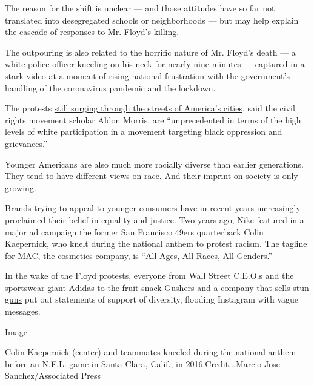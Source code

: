 The reason for the shift is unclear --- and those attitudes have so far
not translated into desegregated schools or neighborhoods --- but may
help explain the cascade of responses to Mr. Floyd's killing.

The outpouring is also related to the horrific nature of Mr. Floyd's
death --- a white police officer kneeling on his neck for nearly nine
minutes --- captured in a stark video at a moment of rising national
frustration with the government's handling of the coronavirus pandemic
and the lockdown.

The protests
\href{https://www.nytimes.com/interactive/2020/06/13/us/george-floyd-protests-cities-photos.html?action=click\&module=Top\%20Stories\&pgtype=Homepage}{still
surging through the streets of America's cities}, said the civil rights
movement scholar Aldon Morris, are ``unprecedented in terms of the high
levels of white participation in a movement targeting black oppression
and grievances.''

Younger Americans are also much more racially diverse than earlier
generations. They tend to have different views on race. And their
imprint on society is only growing.

Brands trying to appeal to younger consumers have in recent years
increasingly proclaimed their belief in equality and justice. Two years
ago, Nike featured in a major ad campaign the former San Francisco 49ers
quarterback Colin Kaepernick, who knelt during the national anthem to
protest racism. The tagline for MAC, the cosmetics company, is ``All
Ages, All Races, All Genders.''

In the wake of the Floyd protests, everyone from
\href{https://www.cnbc.com/2020/06/01/wall-street-ceos-speak-out-about-george-floyd-and-protests-rocking-us-cities.html}{Wall
Street C.E.O.s} and the
\href{https://www.nytimes.com/2020/06/10/business/adidas-black-employees-discrimination.html?searchResultPosition=1}{sportswear
giant Adidas} to the
\href{https://www.themarysue.com/gushers-finally-weighs-in-on-black-lives-matter/}{fruit
snack Gushers} and a company that
\href{https://www.axon.com/news/axon-statement-on-the-death-of-george-floyd}{sells
stun guns} put out statements of support of diversity, flooding
Instagram with vague messages.

Image

Colin Kaepernick (center) and teammates kneeled during the national
anthem before an N.F.L. game in Santa Clara, Calif., in
2016.Credit...Marcio Jose Sanchez/Associated Press

